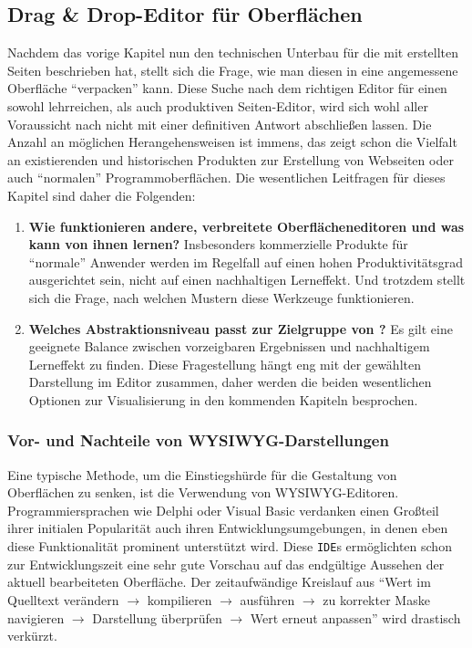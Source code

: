 \subsection{Drag \& Drop-Editor für Oberflächen}
\label{sec:drag-drop-ui-editor}

Nachdem das vorige Kapitel nun den technischen Unterbau für die mit \idename{} erstellten Seiten beschrieben hat, stellt sich die Frage, wie man diesen in eine angemessene Oberfläche "`verpacken"' kann. Diese Suche nach dem richtigen Editor für einen sowohl lehrreichen, als auch produktiven Seiten-Editor, wird sich wohl aller Voraussicht nach nicht mit einer definitiven Antwort abschließen lassen. Die Anzahl an möglichen Herangehensweisen ist immens, das zeigt schon die Vielfalt an existierenden und historischen Produkten zur Erstellung von Webseiten oder auch "`normalen"' Programmoberflächen. Die wesentlichen Leitfragen für dieses Kapitel sind daher die Folgenden:

\begin{enumerate}[noitemsep]
\item \textbf{Wie funktionieren andere, verbreitete Oberflächeneditoren und was kann \idename{} von ihnen lernen?} Insbesonders kommerzielle Produkte für "`normale"' Anwender werden im Regelfall auf einen hohen Produktivitätsgrad ausgerichtet sein, nicht auf einen nachhaltigen Lerneffekt. Und trotzdem stellt sich die Frage, nach welchen Mustern diese Werkzeuge funktionieren.
\item \textbf{Welches Abstraktionsniveau passt zur Zielgruppe von \idename{}?} Es gilt eine geeignete Balance zwischen vorzeigbaren Ergebnissen und nachhaltigem Lerneffekt zu finden. Diese Fragestellung hängt eng mit der gewählten Darstellung im Editor zusammen, daher werden die beiden wesentlichen Optionen zur Visualisierung in den kommenden Kapiteln besprochen.
\end{enumerate}

\subsubsection{Vor- und Nachteile von WYSIWYG-Darstellungen}
\label{sec:pro-con-wysiwyg-editor}

Eine typische Methode, um die Einstiegshürde für die Gestaltung von Oberflächen zu senken, ist die Verwendung von WYSIWYG-Editoren. Programmiersprachen wie Delphi oder Visual Basic verdanken einen Großteil ihrer initialen Popularität auch ihren Entwicklungsumgebungen, in denen eben diese Funktionalität prominent unterstützt wird. Diese \texttt{IDE}s ermöglichten schon zur Entwicklungszeit eine sehr gute Vorschau auf das endgültige Aussehen der aktuell bearbeiteten Oberfläche. Der zeitaufwändige Kreislauf aus "`Wert im Quelltext verändern $\rightarrow$  kompilieren $\rightarrow$ ausführen $\rightarrow$ zu korrekter Maske navigieren $\rightarrow$ Darstellung überprüfen $\rightarrow$ Wert erneut anpassen"' wird drastisch verkürzt.

